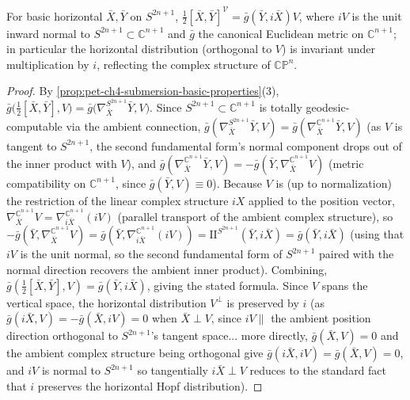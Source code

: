 \begin{proposition}
  \label{prop:pet-ch4-cpn-integrability-tensor}
  For basic horizontal $\bar X,\bar Y$ on $S^{2n+1}$, $\tfrac12[\bar X,\bar Y]^{\mathcal V}=\bar g(\bar Y,i\bar X)V$,
  where $iV$ is the unit inward normal to $S^{2n+1}\subset\mathbb{C}^{n+1}$ and
  $\bar g$ the canonical Euclidean metric on $\mathbb{C}^{n+1}$; in particular the
  horizontal distribution (orthogonal to $V$) is invariant under
  multiplication by $i$, reflecting the complex structure of $\mathbb{CP}^n$.
\end{proposition}
\begin{proof}
  By \cref{prop:pet-ch4-submersion-basic-properties}(3),
  $\bar g\big(\tfrac12[\bar X,\bar Y],V\big)=\bar g\big(\nabla^{S^{2n+1}}_{\bar X}\bar Y,V\big)$.
  Since $S^{2n+1}\subset\mathbb{C}^{n+1}$ is totally geodesic-computable via the
  ambient connection, $\bar g(\nabla^{S^{2n+1}}_{\bar X}\bar Y,V)=\bar g(\nabla^{\mathbb{C}^{n+1}}_{\bar X}\bar Y,V)$
  (as $V$ is tangent to $S^{2n+1}$, the second fundamental form's normal
  component drops out of the inner product with $V$), and
  $\bar g(\nabla^{\mathbb{C}^{n+1}}_{\bar X}\bar Y,V)=-\bar g(\bar Y,\nabla^{\mathbb{C}^{n+1}}_{\bar X}V)$
  (metric compatibility on $\mathbb{C}^{n+1}$, since $\bar g(\bar Y,V)\equiv0$).
  Because $V$ is (up to normalization) the restriction of the linear complex
  structure $iX$ applied to the position vector, $\nabla^{\mathbb{C}^{n+1}}_{\bar X}V=\nabla^{\mathbb{C}^{n+1}}_{i\bar X}(iV)$
  (parallel transport of the ambient complex structure), so
  $-\bar g(\bar Y,\nabla^{\mathbb{C}^{n+1}}_{\bar X}V)=\bar g(\bar Y,\nabla^{\mathbb{C}^{n+1}}_{i\bar X}(iV))
  =\mathrm{II}^{S^{2n+1}}(\bar Y,i\bar X)=\bar g(\bar Y,i\bar X)$ (using that
  $iV$ is the unit normal, so the second fundamental form of $S^{2n+1}$ paired
  with the normal direction recovers the ambient inner product). Combining,
  $\bar g(\tfrac12[\bar X,\bar Y],V)=\bar g(\bar Y,i\bar X)$, giving the stated
  formula. Since $V$ spans the vertical space, the horizontal distribution
  $V^\perp$ is preserved by $i$ (as $\bar g(i\bar X,V)=-\bar g(\bar X,iV)=0$
  when $\bar X\perp V$, since $iV\parallel$ the ambient position direction
  orthogonal to $S^{2n+1}$'s tangent space... more directly, $\bar g(\bar X,V)=0$
  and the ambient complex structure being orthogonal give $\bar g(i\bar X,iV)=\bar g(\bar X,V)=0$,
  and $iV$ is normal to $S^{2n+1}$ so tangentially $i\bar X\perp V$ reduces to
  the standard fact that $i$ preserves the horizontal Hopf distribution).
\end{proof}

